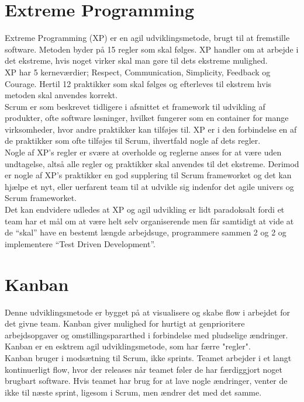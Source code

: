 \section{Extreme Programming}\label{sec:xp}
Extreme Programming (XP) er en agil udviklingsmetode, brugt til at fremstille software. Metoden byder på 15 regler som skal følges. XP handler om at arbejde i det ekstreme, 
hvis noget virker skal man gøre til dets ekstreme mulighed.  \\

XP har 5 kerneværdier; Respect, Communication, Simplicity, Feedback og Courage. Hertil 12 praktikker som 
skal følges og efterleves til ekstrem hvis metoden skal anvendes korrekt. \\

Scrum er som beskrevet tidligere i afsnittet et framework til udvikling af produkter, ofte software løsninger, 
hvilket fungerer som en container for mange virksomheder, hvor andre praktikker kan tilføjes til. XP er i den 
forbindelse en af de praktikker som ofte tilføjes til Scrum, ihvertfald nogle af dets regler. \\

Nogle af XP’s regler er svære at overholde og reglerne anses for at være uden undtagelse, altså alle regler 
og praktikker skal anvendes til det ekstreme. Derimod er nogle af XP’s praktikker en god supplering til 
Scrum frameworket og det kan hjælpe et nyt, eller uerfarent team til at udvikle sig indenfor det agile 
univers og Scrum frameworket. \\

Det kan endvidere udledes at XP og agil udvikling er lidt paradoksalt fordi et team har et mål om at være helt selv organiserende men får 
samtidigt at vide at de “skal” have en bestemt længde arbejdsuge, programmere sammen 2 og 2 og implementere “Test Driven Development”. 

\section{Kanban}\label{sec:kanban}
Denne udviklingsmetode er bygget på at visualisere og skabe flow i arbejdet for det givne team. Kanban giver 
mulighed for hurtigt at genprioritere arbejdsopgaver og omstillingspararthed i forbindelse med pludselige ændringer. 
Kanban er en esktrem agil udviklingsmetode, som har færre "regler".\\

Kanban\cite{Kanban} bruger i modsætning til Scrum, ikke sprints. Teamet arbejder i et langt kontinuerligt flow, hvor der releases
når teamet føler de har færdiggjort noget brugbart software. Hvis teamet har brug for at lave nogle ændringer,
venter de ikke til næste sprint, ligesom i Scrum, men ændrer det med det samme. \\

